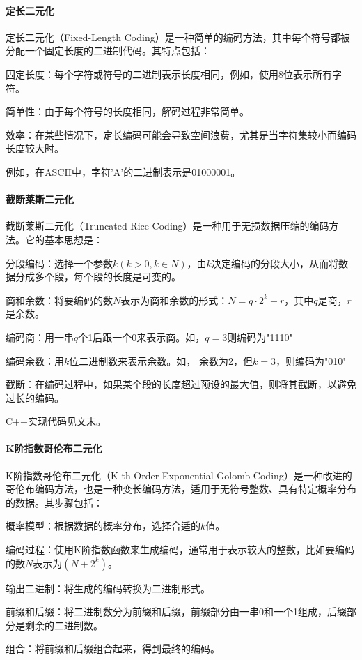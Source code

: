 \documentclass{/home/hi/Study/template/code}
\begin{document}
\paragraph{定长二元化}
定长二元化（Fixed-Length Coding）是一种简单的编码方法，其中每个符号都被分配一个固定长度的二进制代码。其特点包括：

固定长度：每个字符或符号的二进制表示长度相同，例如，使用8位表示所有字符。

简单性：由于每个符号的长度相同，解码过程非常简单。

效率：在某些情况下，定长编码可能会导致空间浪费，尤其是当字符集较小而编码长度较大时。

例如，在ASCII中，字符'A'的二进制表示是01000001。


\paragraph{截断莱斯二元化}
截断莱斯二元化（Truncated Rice Coding）是一种用于无损数据压缩的编码方法。它的基本思想是：
\begin{serialNumber}
	\item 分段编码：选择一个参数$k ( k > 0 , k \in N )$，由$k$决定编码的分段大小，从而将数据分成多个段，每个段的长度是可变的。
	\item 商和余数：将要编码的数$ N $表示为商和余数的形式：\( N = q \cdot 2^k + r \)，其中\( q \)是商，\( r \)是余数。
	\item 编码商：用一串\( q \)个1后跟一个0来表示商。如，$q = 3$则编码为"1110"
	\item 编码余数：用\( k \)位二进制数来表示余数。如， 余数为2，但$k = 3$，则编码为"010"
	\item 截断：在编码过程中，如果某个段的长度超过预设的最大值，则将其截断，以避免过长的编码。
\end{serialNumber}
C++实现代码见文末。



\paragraph{K阶指数哥伦布二元化}
K阶指数哥伦布二元化（K-th Order Exponential Golomb Coding）是一种改进的哥伦布编码方法，也是一种变长编码方法，适用于无符号整数、具有特定概率分布的数据。其步骤包括：

\begin{serialNumber}
	\item 概率模型：根据数据的概率分布，选择合适的$k$值。
	\item 编码过程：使用K阶指数函数来生成编码，通常用于表示较大的整数，比如要编码的数$N$表示为$( N + 2^{k} )$。
	\item 输出二进制：将生成的编码转换为二进制形式。
	\item 前缀和后缀：将二进制数分为前缀和后缀，前缀部分由一串0和一个1组成，后缀部分是剩余的二进制数。
	\item 组合：将前缀和后缀组合起来，得到最终的编码。
\end{serialNumber}
\end{document}
